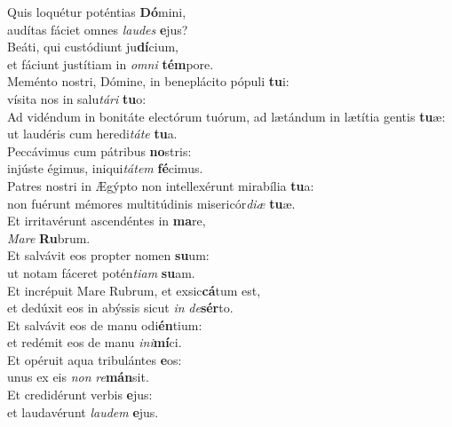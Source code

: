 \evenverse Quis loquétur poténtias \textbf{Dó}mini,~\*\\
\evenverse audítas fáciet omnes \textit{lau}\textit{des} \textbf{e}jus?\\
\oddverse Beáti, qui custódiunt ju\textbf{dí}cium,~\*\\
\oddverse et fáciunt justítiam in \textit{om}\textit{ni} \textbf{tém}pore.\\
\evenverse Meménto nostri, Dómine, in beneplácito pópuli \textbf{tu}i:~\*\\
\evenverse vísita nos in salu\textit{tá}\textit{ri} \textbf{tu}o:\\
\oddverse Ad vidéndum in bonitáte electórum tuórum, ad lætándum in lætítia gentis \textbf{tu}æ:~\*\\
\oddverse ut laudéris cum heredi\textit{tá}\textit{te} \textbf{tu}a.\\
\evenverse Peccávimus cum pátribus \textbf{no}stris:~\*\\
\evenverse injúste égimus, iniqui\textit{tá}\textit{tem} \textbf{fé}cimus.\\
\oddverse Patres nostri in Ægýpto non intellexérunt mirabília \textbf{tu}a:~\*\\
\oddverse non fuérunt mémores multitúdinis misericór\textit{di}\textit{æ} \textbf{tu}æ.\\
\evenverse Et irritavérunt ascendéntes in \textbf{ma}re,~\*\\
\evenverse \textit{Ma}\textit{re} \textbf{Ru}brum.\\
\oddverse Et salvávit eos propter nomen \textbf{su}um:~\*\\
\oddverse ut notam fáceret potén\textit{ti}\textit{am} \textbf{su}am.\\
\evenverse Et incrépuit Mare Rubrum, et exsic\textbf{cá}tum est,~\*\\
\evenverse et dedúxit eos in abýssis sicut \textit{in} \textit{de}\textbf{sér}to.\\
\oddverse Et salvávit eos de manu odi\textbf{én}tium:~\*\\
\oddverse et redémit eos de manu \textit{i}\textit{ni}\textbf{mí}ci.\\
\evenverse Et opéruit aqua tribulántes \textbf{e}os:~\*\\
\evenverse unus ex eis \textit{non} \textit{re}\textbf{mán}sit.\\
\oddverse Et credidérunt verbis \textbf{e}jus:~\*\\
\oddverse et laudavérunt \textit{lau}\textit{dem} \textbf{e}jus.\\
